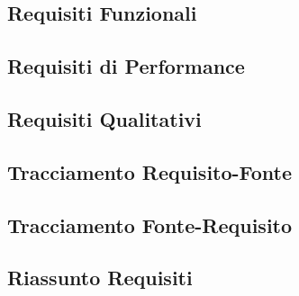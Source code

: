 \documentclass[a4paper,titlepage]{article}
\begin{document}
\newpage
\subsection{Requisiti Funzionali}
\label{sub:Requisiti Funzionali}


\newpage
\subsection{Requisiti di Performance}
\label{sub:Requisiti di Performance}


\newpage
\subsection{Requisiti Qualitativi}
\label{sub:Requisiti Qualitativi}


\newpage
\subsection{Tracciamento Requisito-Fonte}
\label{sub:Tracciamento Requisito-Fonte}


\newpage
\subsection{Tracciamento Fonte-Requisito}
\label{sub:Tracciamento Fonte-Requisito}


\newpage
\subsection{Riassunto Requisiti}
\label{sub:Riassunto Requisiti}

\end{document}
